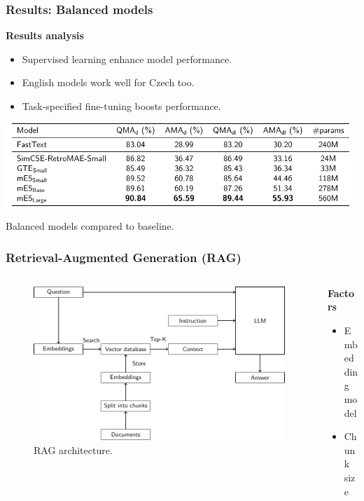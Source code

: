 \documentclass{beamer}
\begin{document}
\begin{frame}
  \frametitle{Results: Balanced models}
  \textcolor{cvut_navy}{\textbf{Results analysis}}
  \begin{itemize}
    \item Supervised learning enhance model performance.
    \item English models work well for Czech too.    
    \item Task-specified fine-tuning boosts performance. 
  \end{itemize}
  \begin{table}
    \centering
    \includegraphics[scale=0.8]{src/fig/pdfs/tables/balanced.pdf}
    \caption{Balanced models compared to baseline.}
  \end{table}
\end{frame}


\begin{frame}
  \frametitle{Retrieval-Augmented Generation (RAG)}
  \begin{columns}[onlytextwidth,T]
    \begin{column}{0.75\textwidth}
      \begin{figure}[h]
        \includegraphics[scale=0.6]{src/fig/pdfs/tikz/RAG_scheme.pdf}
        \caption{RAG architecture.}
       \end{figure}
    \end{column}

    \begin{column}{0.75\textwidth}
      \vspace{10px}
      \textcolor{cvut_navy}{\textbf{Factors}}
      \begin{itemize}
        \item Embedding \\model
        \item Chunk size
      \end{itemize}
    \end{column}
  \end{columns}
\end{frame}
\end{document}

